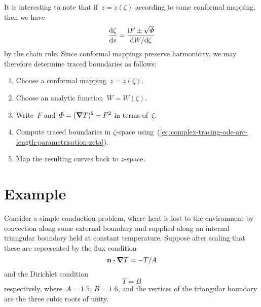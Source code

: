 It is interesting to note that
if~$z = z (\zeta)$ according to some conformal mapping,
then we have
\begin{equation}
  \tder{\zeta}{s} = \frac{\ii F \pm \sqrt{\Phi}}{\td W / {\td\zeta}}
  \label{eq:complex-tracing-ode-arc-length-parametrisation-zeta}
\end{equation}
by the chain rule.
Since conformal mappings preserve harmonicity,
we may therefore determine traced boundaries as follows:
\begin{enumerate}
  \tightlist
  \item
    Choose a conformal mapping~$z = z (\zeta)$.
  \item
    Choose an analytic function~$W = W (\zeta)$.
  \item
    Write~$F$ and~$\varPhi = (\mathop{}\!\boldsymbol{\mathbf{\nabla}} T)^2 - F^2$ in terms of~$\zeta$.
  \item
    Compute traced boundaries in $\zeta$-space
    using~(\ref{eq:complex-tracing-ode-arc-length-parametrisation-zeta}).
  \item
    Map the resulting curves back to $z$-space.
\end{enumerate}

\section{Example}
\label{sec:complex.example}

Consider a simple conduction problem,
where heat is lost to the environment
by convection along some external boundary
and supplied along an internal triangular boundary
held at constant temperature.
Suppose after scaling that these are represented
by the flux condition
\begin{equation}
  \mathop{}\!\boldsymbol{\mathbf{n}} \boldsymbol{\cdot} \mathop{}\!\boldsymbol{\mathbf{\nabla}} T = -T / A
  \label{eq:example-flux-boundary-condition}
\end{equation}
and the Dirichlet condition
\begin{equation}
  T = B
  \label{eq:example-dirichlet-condition}
\end{equation}
respectively,
where~$A = 1.5$, $B = 1.6$,
and the vertices of the triangular boundary
are the three cubic roots of unity.

